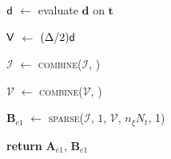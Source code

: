 \begin{vAlgorithm}[!ht]{1\columnwidth}{0em}
{$\textup{\textsf{d}}$ $\gets$ evaluate $\bm{d}$ on $\bm{t}$

$\textup{\textsf{V}}$ $\gets$ $(\Delta/2) \textup{\textsf{d}}$ 

$\mathcal{I}$ $\gets$ \textsc{combine}($\mathcal{I}$, )

$\mathcal{V}$ $\gets$ \textsc{combine}($\mathcal{V}$, )

}

$\mathbf{B}_{e1}$ $\gets$ \textsc{sparse}($\mathcal{I}$, $1$, $\mathcal{V}$, $n_\xi N_t$, 1) 

\textbf{return} $\mathbf{A}_{e1}$, $\mathbf{B}_{e1}$ 


\end{vAlgorithm}












